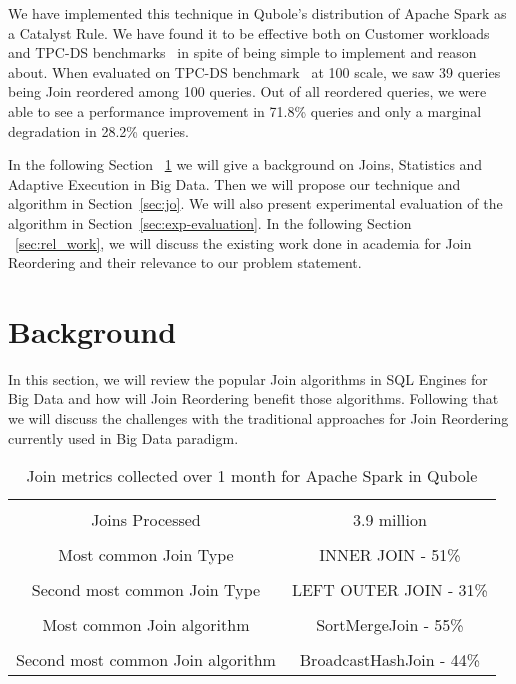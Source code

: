 \documentclass[conference]{IEEEtran}
\begin{document}
We have implemented this technique in Qubole's distribution of Apache Spark as a Catalyst Rule. We have found it to be effective both on Customer workloads and TPC-DS benchmarks~\cite{b14} in spite of being simple to implement and reason about. When evaluated on TPC-DS benchmark~\cite{b14}  at 100 scale, we saw 39 queries being Join reordered among 100 queries. Out of all reordered queries, we were able to see a performance improvement in 71.8\% queries and only a marginal degradation in 28.2\% queries.

In the following Section ~\ref{sec:background} we will give a background on Joins, Statistics and Adaptive Execution in Big Data. Then we will propose our technique and algorithm in Section~\ref{sec:jo}. We will also present experimental evaluation of the algorithm in Section~\ref{sec:exp-evaluation}. In the following Section ~\ref{sec:rel_work}, we will discuss the existing work done in academia for Join Reordering and their relevance to our problem statement.

\section{Background}\label{sec:background}

In this section, we will review the popular Join algorithms in SQL Engines for Big Data and how will Join Reordering benefit those algorithms. Following that we will discuss the challenges with the traditional approaches for Join Reordering currently used in Big Data paradigm.

\begin{table}[h]
\begin{center}
\begin{tabular}{ |c|c| }
 \hline \\
Joins Processed & 3.9 million \\ \hline \\
Most common Join Type & INNER JOIN - 51\%  \\  \hline \\
Second most common Join Type &  LEFT OUTER JOIN - 31\%\\ \hline  \\
Most common Join algorithm & SortMergeJoin - 55\%\\ \hline \\
Second most common Join algorithm & BroadcastHashJoin - 44\%\\
 \hline
\end{tabular}
\label{tab:stats}
\end{center}
\caption{Join metrics collected over 1 month for Apache Spark in Qubole}
\end{table}
\end{document}
